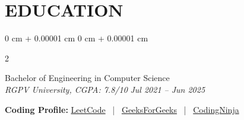 \documentclass[10pt, a4paper]{article}
\newcommand{\semibold}[1]{{\fontseries{sb}\selectfont #1}}
\newenvironment{highlights}{
    \begin{itemize}[
        topsep=0.10 cm,
        parsep=0.10 cm,
        partopsep=0pt,
        itemsep=0pt,
        leftmargin=0 cm + 10pt
    ]
}{
    \end{itemize}
}
\newenvironment{onecolentry}{
    \begin{adjustwidth}{
        0 cm + 0.00001 cm
    }{
        0 cm + 0.00001 cm
    }
}{
    \end{adjustwidth}
}
\newenvironment{footer}{
    \setlength{\topsep}{0pt}\par\kern\topsep\centering\linespread{1.5}
}{
    \par\kern\topsep
}
\newenvironment{twocolentry}[2][]{
    \onecolentry
    \def\secondColumn{#2}
    \setcolumnwidth{\fill, 4.5 cm}
    \begin{paracol}{2}
}{
    \switchcolumn \raggedleft \secondColumn
    \end{paracol}
    \endonecolentry
}
\begin{document}

\section{EDUCATION}

\begin{twocolentry}{
    \textit{Jul 2021 – Jun 2025}
}
    \semibold{Bachelor of Engineering in Computer Science} \\
    \textit{RGPV University, CGPA: 7.8/10}\end{twocolentry}

        \vspace{0.10 cm}

\begin{footer}
    \vspace{1cm}
    \textbf{Coding Profile:} \href{https://leetcode.com/harshsingh-io}{\textcolor{highlightColor}{LeetCode}} \ | \ 
    \href{https://auth.geeksforgeeks.org/user/harshsingh704888}{\textcolor{highlightColor}{GeeksForGeeks}} \ | \ 
    \href{https://www.codingninjas.com/codestudio/profile/harshsingh_io}{\textcolor{highlightColor}{CodingNinja}}
\end{footer}
\end{document}
